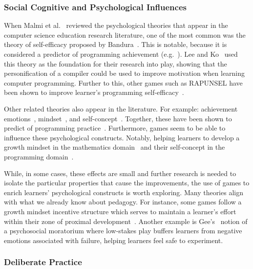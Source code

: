 \documentclass{sig-alternate-05-2015}
\begin{document}
\subsubsection{Social Cognitive and Psychological Influences}


When Malmi et al.~\cite{Malmi2010review-cseResearchCharacter, Malmi2014-cseResearchUnderpinnings} reviewed the psychological theories that appear in the computer science education research literature, one of the most common was the theory of self-efficacy proposed by Bandura~\cite{bandura1977self}. This is notable, because it is considered a predictor of programming achievement (e.g.~\cite{ramalingam2004self}). Lee and Ko~\cite{lee2011personifying} used this theory as the foundation for their research into play, showing that the personification of a compiler could be used to improve motivation when learning computer programming. Further to this, other games such as RAPUNSEL have been shown to improve learner's programming self-efficacy~\cite{plass2009rapunsel}.



Other related theories also appear in the literature. For example: achievement emotions~\cite{pekrun2006theory-controlValueEmotions}, mindset~\cite{dweck:helplessness, dweck2006mindset}, and self-concept~\cite{shavelson1976self,marsh2011self}. Together, these have been shown to predict of programming practice~\cite{scott2013review-deliberatePractice, scott2014measuring, scott2014qexp-mindsets}. Furthermore, games seem to be able to influence these psychological constructs. Notably, helping learners to develop a growth mindset in the mathematics domain~\cite{o2014brain} and their self-concept in the programming domain~\cite{scott:sigcse13}. 



While, in some cases, these effects are small and further research is needed to isolate the particular properties that cause the improvements, the use of games to enrich learners' psychological constructs is worth exploring. Many theories align with what we already know about pedagogy. For instance, some games follow a growth mindset incentive structure which serves to maintain a learner's effort within their zone of proximal development~\cite{vygotsky1980-seminal}. Another example is Gee's~\cite{gee2003video} notion of a psychosocial moratorium where low-stakes play buffers learners from negative emotions associated with failure, helping learners feel safe to experiment.\subsubsection{Deliberate Practice}
\end{document}
